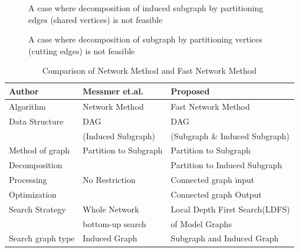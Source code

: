 \begin{enumerate}
\begin{enumerate}
\end{enumerate}





\begin{figure}
\centering

\caption{A case where decomposition of induced subgraph by partitioning edges (shared vertices) is not feasible \label{fig:fig66} }
\end{figure}


\begin{figure}
\centering

\caption{A case where decomposition of subgraph by partitioning vertices (cutting edges) is not feasible \label{fig:fig7} }
\end{figure}


\begin{table}
\begin{center}
\begin{tabular}{|l|l|l|}
\hline
Author  & Messmer et.al.  & Proposed  \\ \hline
Algorithm & Network Method & Fast Network Method \\ \hline
Data Structure & DAG                 & DAG                            \\ 
               &  (Induced Subgraph) &  (Subgraph \& Induced Subgraph) \\ \hline
Method of graph  & Partition to Subgraph  & Partition to Subgraph \\ 
Decomposition    &                        & Partition to Induced Subgraph \\ \hline
Processing    & No Restriction  & Connected graph input                     \\ 
Optimization      &                   & Connected graph Output                 \\ \hline 
Search Strategy & Whole Network           & Local Depth First Search(LDFS) \\ 
                & bottom-up search          &  of Model Graphs   \\ \hline
Search graph type & Induced Graph & Subgraph and Induced Graph \\ \hline

\end{tabular}
\caption{ Comparison of Network Method and Fast Network Method \label{tab:table1} }
\end{center}
\end{table}
